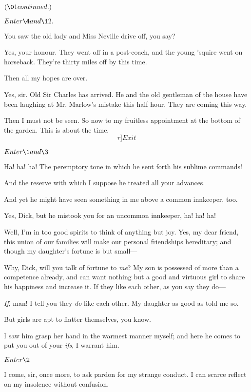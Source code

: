 \documentclass{book}
\begin{document}
\Act


\((\01 continued.)\)


\(Enter \4 and \12.\)


\4  You saw the old lady and Miss Neville drive off, you say?

  Yes, your honour.  They went off in a post-coach, and the
young 'squire went on horseback.  They're thirty miles off by this
time.

\4  Then all my hopes are over.

  Yes, sir.  Old Sir Charles has arrived.  He and the old
gentleman of the house have been laughing at Mr. Marlow's mistake this
half hour.  They are coming this way.

\4  Then I must not be seen.  So now to my fruitless
appointment at the bottom of the garden.  This is about the time. 
\[r]Exit\]


\(Enter \1 and \3\)


\3  Ha! ha! ha!  The peremptory tone in which he sent forth
his sublime commands!

\1  And the reserve with which I suppose he treated all your
advances.

\3  And yet he might have seen something in me above a common
innkeeper, too.

\1  Yes, Dick, but he mistook you for an uncommon innkeeper,
ha! ha! ha!

\3  Well, I'm in too good spirits to think of anything but
joy.  Yes, my dear friend, this union of our families will make our
personal friendships hereditary; and though my daughter's fortune is
but small---

\1  Why, Dick, will you talk of fortune to \textit{me}?  My son is
possessed of more than a competence already, and can want nothing but a
good and virtuous girl to share his happiness and increase it.  If they
like each other, as you say they do---

\3  \textit{If}, man!  I tell you they \textit{do} like each other.  My
daughter as good as told me so.

\1  But girls are apt to flatter themselves, you know.

\3  I saw him grasp her hand in the warmest manner myself; and
here he comes to put you out of your \textit{ifs}, I warrant him.


\(Enter \2\)


\2  I come, sir, once more, to ask pardon for my strange conduct. 
I can scarce reflect on my insolence without confusion.
\end{document}
